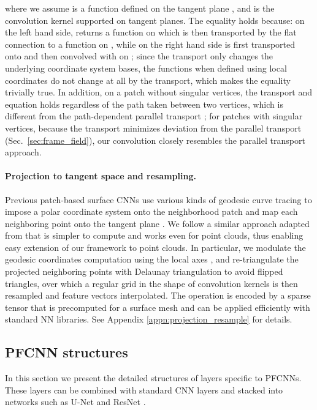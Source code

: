 \documentclass[10pt,twocolumn,letterpaper]{article}
\begin{document}
where we assume  is a function defined on the tangent plane , and  is the convolution kernel supported on tangent planes.
The equality holds because: on the left hand side,  returns a function on  which is then transported by the flat connection  to a function on , while on the right hand side  is first transported onto  and then convolved with  on ; since the transport  only changes the underlying coordinate system bases, the functions  when defined using local coordinates do not change at all by the transport, which makes the equality trivially true.
In addition, on a patch without singular vertices, the transport and equation holds regardless of the path taken between two vertices, which is different from the path-dependent parallel transport \cite{Poulenard:2018:Multidirectional};
for patches with singular vertices, because the transport minimizes deviation from the parallel transport (Sec.~\ref{sec:frame_field}), our convolution closely resembles the parallel transport approach.

\vspace{-3mm}
\paragraph{Projection to tangent space and resampling.}
Previous patch-based surface CNNs use various kinds of geodesic curve tracing to impose a polar coordinate system onto the neighborhood patch  and map each neighboring point onto the tangent plane \cite{GeoCNN:ICCV2015,AnisoCNN:NIPS2016,MoNet2017,Poulenard:2018:Multidirectional}. 
We follow a similar approach adapted from \cite{Budninskiy2018ParallelTU} that is simpler to compute and works even for point clouds, thus enabling easy extension of our framework to point clouds.
In particular, we modulate the geodesic coordinates computation using the local axes , and re-triangulate the projected neighboring points with Delaunay triangulation to avoid flipped triangles, over which a regular grid in the shape of convolution kernels is then resampled and feature vectors interpolated.
The operation is encoded by a sparse tensor  that is precomputed for a surface mesh and can be applied efficiently with standard NN libraries.
See Appendix \ref{appn:projection_resample} for details.

\subsection{PFCNN structures}
\label{sec:layers}

In this section we present the detailed structures of layers specific to PFCNNs. 
These layers can be combined with standard CNN layers and stacked into networks such as U-Net \cite{ronneberger2015u} and ResNet \cite{he2016deep}.
\end{document}
